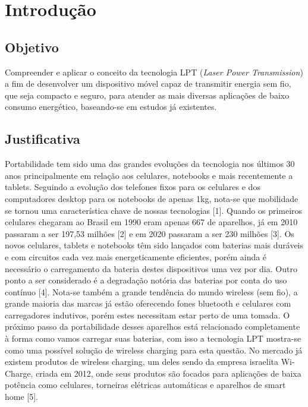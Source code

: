 \chapter{Introdução}

\section{Objetivo}

Compreender e aplicar o conceito da tecnologia LPT (\emph{Laser Power Transmission}) a fim de desenvolver um dispositivo móvel capaz de transmitir energia sem fio, que seja compacto e seguro, para atender as mais diversas aplicações de baixo consumo energético, baseando-se em estudos já existentes.

\section{Justificativa}

Portabilidade tem sido uma das grandes evoluções da tecnologia nos últimos 30 anos principalmente em relação aos celulares, notebooks e mais recentemente a tablets. Seguindo a evolução dos telefones fixos para os celulares e dos computadores desktop para os notebooks de apenas 1kg, nota-se que mobilidade se tornou uma característica chave de nossas tecnologias [1]. Quando os primeiros celulares chegaram ao Brasil em 1990 eram apenas 667 de aparelhos, já em 2010 passaram a ser 197,53 milhões [2] e em 2020 passaram a ser 230 milhões [3]. Os novos celulares, tablets e notebooks têm sido lançados com baterias mais duráveis e com circuitos cada vez mais energeticamente eficientes, porém ainda é necessário o carregamento da bateria destes dispositivos uma vez por dia. Outro ponto a ser considerado é a degradação notória das baterias por conta do uso contínuo [4]. Nota-se também a grande tendência do mundo wireless (sem fio), a grande maioria das marcas já estão oferecendo fones bluetooth e celulares com carregadores indutivos, porém estes necessitam estar perto de uma tomada. O próximo passo da portabilidade desses aparelhos está relacionado completamente à forma como vamos carregar suas baterias, com isso a tecnologia LPT mostra-se como uma possível solução de wireless charging para esta questão. No mercado já existem produtos de wireless charging, um deles sendo da empresa israelita Wi-Charge, criada em 2012, onde seus produtos são focados para aplicações de baixa potência como celulares, torneiras elétricas automáticas e aparelhos de smart home [5].
